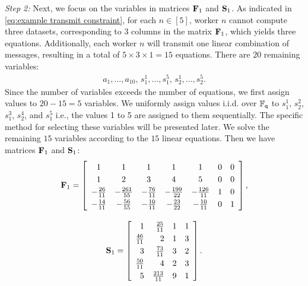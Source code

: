 \documentclass[conference,letterpaper]{IEEEtran}
\begin{document}
\begin{example}
{\it Step 2:}
Next, we focus on the variables in matrices \( {\bf F}_1 \) and \( {\bf S}_1 \). As indicated in \eqref{eq:example transmit constraint}, for each \( n \in [5] \), worker \( n \) cannot compute three datasets, corresponding to 3 columns in the matrix \( {\bf F}_1\), which yields three equations. Additionally, each worker \( n \) will transmit one linear combination of messages, resulting in a total of \( 5 \times 3 \times 1 = 15 \) equations. There are $20$ remaining variables:
\begin{align}
a_{1}, \ldots, a_{10}, \, s^{1}_1, \ldots, s^{5}_1, \, s^{1}_2, \ldots, s^{5}_2. \label{eq:example tj1 all variables}
\end{align}
Since the number of variables exceeds the number of equations, we first assign values to \( 20 - 15 = 5 \) variables. We uniformly assign values i.i.d. over \( \mathbb{F}_{{\sf q}} \) to \( s^{1}_1 \), \( s^{2}_2 \), \( s^{3}_1 \), \( s^{4}_2 \), and \( s^{5}_1 \) i.e., the values 1 to 5 are assigned to them sequentially.
 The specific method for selecting these variables will be presented later.
We solve the remaining $15$ variables according to the $15$ linear equations.  Then we have matrices \( {\bf F}_1 \) and \( {\bf S}_1 \):
\begin{equation}
\renewcommand{\arraystretch}{1.25}
{\bf F}_1 = 
\left[
\begin{array}{ccccccc}  
1 & 1 & 1 & 1 & 1 & 0 & 0\\
1 & 2 & 3 & 4 & 5 & 0 & 0\\
-\frac{26}{11} & -\frac{261}{55} & -\frac{76}{11} & -\frac{199}{22} & -\frac{126}{11} & 1 & 0\\
-\frac{14}{11} & -\frac{56}{55} & -\frac{10}{11} & -\frac{23}{22} & -\frac{10}{11} & 0 & 1
\end{array}
\right],
\label{eq:example new F key size}
\end{equation}

\begin{equation}
\renewcommand{\arraystretch}{1.25}
{\bf S}_1 = 
\left[
\begin{array}{rrrr}
1 & \frac{25}{11} & 1 & 1 \\
\frac{46}{11} & 2 & 1 & 3 \\
3 & \frac{73}{11} & 3 & 2 \\
\frac{50}{11} & 4 & 2 & 3 \\
5 & \frac{213}{11} & 9 & 1 
\end{array}
\right].
\label{eq:example new S key size}
\end{equation}


\end{example}
\end{document}
